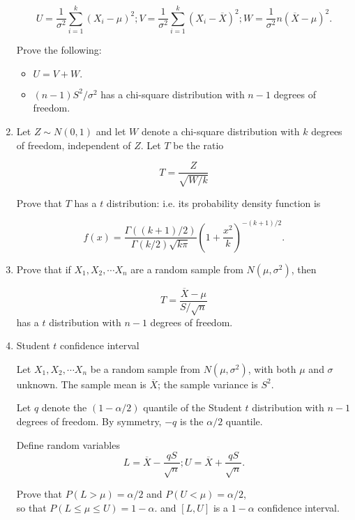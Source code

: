 \documentclass[12pt]{article}
\begin{document}
\begin{enumerate}
$$U = \frac{1}{\sigma^2}\sum_{i=1}^k(X_i - \mu)^2; V = \frac{1}{\sigma^2}\sum_{i=1}^k(X_i - \overline{X})^2; W = \frac{1}{\sigma^2}n(\overline{X} - \mu)^2.$$

 Prove the following:
\begin{itemize}
\item $U = V + W.$
\vspace{120pt}
\item $(n-1)S^2/\sigma^2$ has a chi-square distribution with $n-1$ degrees of freedom.
\end{itemize}

\pagebreak

\item Let $Z \sim N(0,1)$ and let $W$ denote a chi-square distribution with $k$ degrees of freedom, independent of $Z$. Let $T$ be the ratio

$$T = \frac{Z}{\sqrt{W/k}}$$

Prove that $T$ has a $t$ distribution: i.e. its probability density function is

$$f(x) = \frac{\Gamma((k+1)/2)}{\Gamma(k/2)\sqrt{k \pi}} (1 + \frac{x^2}{k})^{-(k+1)/2}.$$

\pagebreak

\item Prove that if $X_1, X_2, \cdots X_n$ are a random sample from $N(\mu, \sigma^2)$, then 

$$T = \frac{\overline{X}-\mu}{S/\sqrt{n}}$$ has a $t$ distribution with $n-1$ degrees of freedom.

\pagebreak

\item Student $t$ confidence interval

Let $X_1, X_2, \cdots X_n$ be a random sample from $N(\mu, \sigma^2)$, with both $\mu$ and $\sigma$ unknown. The sample mean is $\overline{X}$; the sample variance is $S^2$.

Let $q$ denote the $(1 - {\alpha}/2)$ quantile of the Student $t$ distribution with $n-1$ degrees of freedom. By symmetry, $-q$ is the $\alpha/2$ quantile.

Define random variables $$L = \overline{X} -  \frac{qS}{\sqrt{n}}; U = \overline{X} +  \frac{qS}{\sqrt{n}}.$$

Prove that $P(L > \mu) = \alpha/2$ and $P(U < \mu) = \alpha/2$,\\ so that $P(L \leq \mu \leq U)  = 1 - \alpha.$ and $[L,U]$ is a $1-\alpha$ confidence interval.
\end{enumerate}
\end{document}
